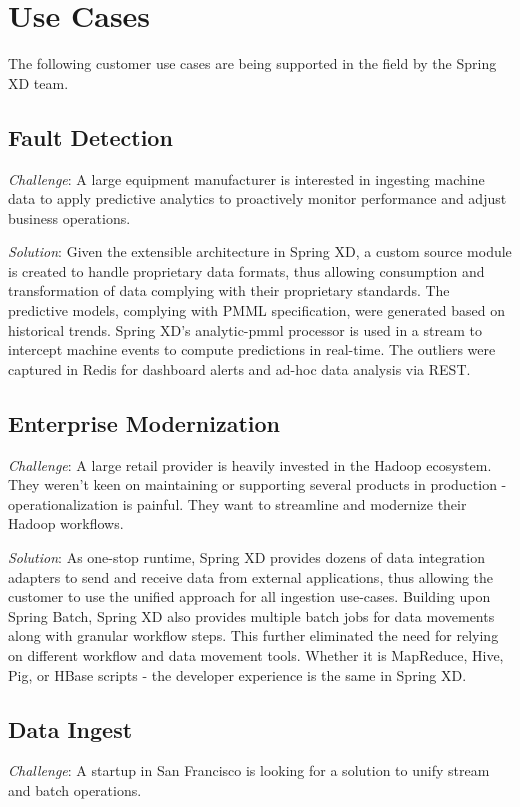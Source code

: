 \section{Use Cases}
\label{sec:Use Cases}

The following customer use cases are being supported in the field by the
Spring XD team.

\subsection{Fault Detection}
\textit{Challenge}: A large equipment manufacturer is interested in
ingesting machine data to apply predictive analytics to proactively monitor
performance and adjust business operations.

\textit{Solution}: Given the extensible architecture in Spring XD, a custom
source module is created to handle proprietary data formats, thus allowing
consumption and transformation of data complying with their proprietary
standards. The predictive models, complying with PMML specification, were
generated based on historical trends. Spring XD's analytic-pmml processor is
used in a stream to intercept machine events to compute predictions in
real-time. The outliers were captured in Redis\cite{redis} for dashboard alerts 
and ad-hoc data analysis via REST.

\subsection{Enterprise Modernization}
\textit{Challenge}: A large retail provider is heavily invested in the Hadoop
\cite{hadoop}
ecosystem. They weren't keen on maintaining or supporting several products in
production - operationalization is painful. They want to streamline and
modernize their Hadoop workflows.

\textit{Solution}: As one-stop runtime, Spring XD provides dozens of data
integration adapters to send and receive data from external applications, thus
allowing the customer to use the unified approach for all ingestion use-cases.
Building upon Spring Batch, Spring XD also provides multiple batch jobs for data movements along with granular workflow steps. This further eliminated the need for relying on different workflow and data movement tools. Whether it is MapReduce, Hive, Pig, or HBase scripts - the developer experience is the same in Spring XD.

\subsection{Data Ingest}
\textit{Challenge}: A startup in San Francisco is looking for a solution to
unify stream and batch operations. 

